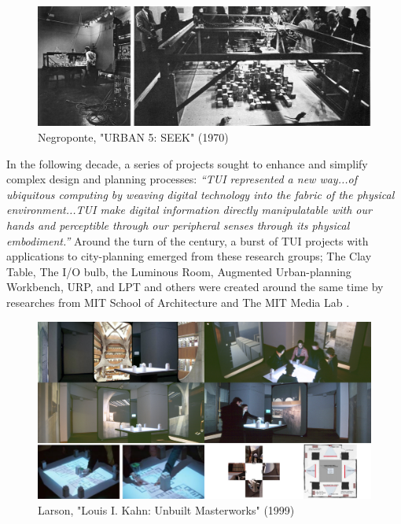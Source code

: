 {{        \begin{figure}[h]
            \begin{center}
                \includegraphics[width=1\textwidth]{chapters/introduction/figures/seek.png}
            \end{center}
            \caption{Negroponte, "URBAN 5: SEEK" (1970) \cite{negroponte1970architecture,negroponte1975soft}}
            \label{fig:seek}
        \end{figure}

        In the following decade, a series of projects sought to enhance and simplify complex design and planning processes: \textit{``TUI represented a new way...of ubiquitous computing by weaving digital technology into the fabric of the physical environment...TUI make digital information directly manipulatable with our hands and perceptible through our peripheral senses through its physical embodiment.''} \cite{Ishii2008} Around the turn of the century, a burst of TUI projects with applications to city-planning emerged from these research groups; The Clay Table, The I/O bulb, the Luminous Room, Augmented Urban-planning Workbench, URP, and LPT and others were created around the same time by researches from MIT School of Architecture and The MIT Media Lab \cite{ishii2002augmented, Ishii2008, Infoscapes, ben-joseph2001, Ullmer2010}.


        \begin{figure}[h]
            \begin{center}
                \includegraphics[width=1\textwidth]{chapters/introduction/figures/larson.png}
            \end{center}
            \caption{Larson, "Louis I. Kahn: Unbuilt Masterworks" (1999) \cite{larson2000louis}}
            \label{fig:larson}
        \end{figure}

}}
